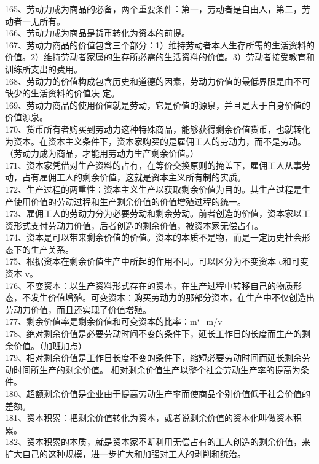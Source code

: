 \documentclass[a4paper,fleqn]{article}
\begin{document}
165、劳动力成为商品的必备，两个重要条件：第一，劳动者是自由人，第二，劳动者一无所有。  \\
166、劳动力成为商品是货币转化为资本的前提。 \\
167、劳动力商品的价值包含三个部分：1）维持劳动者本人生存所需的生活资料的价值。2）维持劳动者家属的生存所必需的生活资料的价值。3）劳动者接受教育和训练所支出的费用。 \\
168、劳动力的价值构成包含历史和道德的因素，劳动力价值的最低界限是由不可缺少的生活资料的价值决 定。 \\
169、劳动力商品的使用价值就是劳动，它是价值的源泉，并且是大于自身价值的价值源泉。 \\
170、货币所有者购买到劳动力这种特殊商品，能够获得剩余价值货币，也就转化为资本。在资本主义条件下，资本家购买的是雇佣工人的劳动力，而不是劳动。（劳动力成为商品，才能用劳动力生产剩余价值。） \\
171、资本家凭借对生产资料的占有，在等价交换原则的掩盖下，雇佣工人从事劳动，占有雇佣工人的剩余价值，这就是资本主义所有制的实质。 \\
172、生产过程的两重性：资本主义生产以获取剩余价值为目的。其生产过程是生产使用价值的劳动过程和生产剩余价值的价值增殖过程的统一。 \\
173、雇佣工人的劳动力分为必要劳动和剩余劳动。前者创造的价值，资本家以工资形式支付劳动力价值，后者创造的剩余价值，被资本家无偿占有。 \\
174、资本是可以带来剩余价值的价值。资本的本质不是物，而是一定历史社会形态下的生产关系。 \\
175、根据资本在剩余价值生产中所起的作用不同。可以区分为不变资本 c和可变资本 v。 \\
176、不变资本：以生产资料形式存在的资本，在生产过程中转移自己的物质形态，不发生价值增殖。可变资本：购买劳动力的那部分资本，在生产中不仅创造出劳动力价值，而且还实现了价值增殖。 \\
177、剩余价值率是剩余价值和可变资本的比率：m‘=m/v  \\
178、绝对剩余价值是必要劳动时间不变的条件下，延长工作日的长度而生产的剩余价值。（加班加点） \\
179、相对剩余价值是工作日长度不变的条件下，缩短必要劳动时间而延长剩余劳动时间所生产的剩余价值。 相对剩余价值生产以整个社会劳动生产率的提高为条件。 \\
180、超额剩余价值是企业由于提高劳动生产率而使商品个别价值低于社会价值的差额。 \\
181、资本积累：把剩余价值转化为资本，或者说剩余价值的资本化叫做资本积累。 \\
182、资本积累的本质，就是资本家不断利用无偿占有的工人创造的剩余价值，来扩大自己的这种规模，进一步扩大和加强对工人的剥削和统治。 \\
\end{document}

